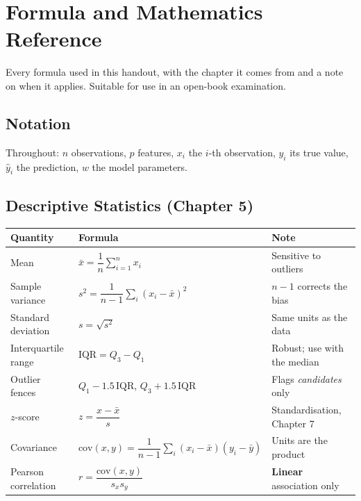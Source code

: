 \chapter{Formula and Mathematics Reference}\label{app:formulas}
\normalfigures

Every formula used in this handout, with the chapter it comes from and a note on
when it applies. Suitable for use in an open-book examination.

\section{Notation}

Throughout: $n$ observations, $p$ features, $x_i$ the $i$-th observation, $y_i$ its
true value, $\hat{y}_i$ the prediction, $w$ the model parameters.

\section{Descriptive Statistics (Chapter 5)}

\begin{center}
\begin{longtable}{@{}L{4.5cm}L{4.6cm}L{4.9cm}@{}}
\toprule
{}
\textbf{Quantity} & \textbf{Formula} & \textbf{Note} \\
\midrule
\endhead
Mean & $\bar{x}=\dfrac{1}{n}\sum_{i=1}^{n}x_i$ & Sensitive to outliers \\
Sample variance & $s^2=\dfrac{1}{n-1}\sum_{i}(x_i-\bar{x})^2$ & $n-1$ corrects the bias \\
Standard deviation & $s=\sqrt{s^2}$ & Same units as the data \\
Interquartile range & $\text{IQR}=Q_3-Q_1$ & Robust; use with the median \\
Outlier fences & $Q_1-1.5\,\text{IQR}$, $Q_3+1.5\,\text{IQR}$ & Flags \emph{candidates} only \\
$z$-score & $z=\dfrac{x-\bar{x}}{s}$ & Standardisation, Chapter 7 \\
Covariance & $\text{cov}(x,y)=\dfrac{1}{n-1}\sum_i(x_i-\bar{x})(y_i-\bar{y})$ & Units are the product \\
Pearson correlation & $r=\dfrac{\text{cov}(x,y)}{s_x s_y}$ & \textbf{Linear} association only \\
\bottomrule
\end{longtable}
\end{center}

